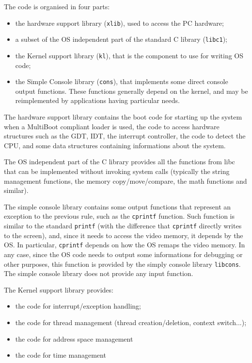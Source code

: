 \documentclass[a4paper]{report}
\begin{document}
The code is organised in four parts: \begin{itemize}
\item the hardware support library ({\tt xlib}), used to access the PC
	hardware;
\item a subset of the OS independent part of the standard C library
	({\tt libc1});
\item the Kernel support library ({\tt kl}), that is the component to
	use for writing OS code;
\item the Simple Console library ({\tt cons}), that implements some
	direct console output functions. These functions generally
	depend on the kernel, and may be reimplemented by applications
	having particular needs.
\end{itemize}

The hardware support library contains the boot code for starting up
the system when a MultiBoot compliant loader is used, the code to
access hardware structures such as the GDT, IDT, the interrupt
controller, the code to detect the CPU, and some data structures
containing informations about the system.

The OS independent part of the C library provides all the functions
from libc that can be implemented without invoking system calls
(typically the string management functions, the memory
copy/move/compare, the math functions and similar).

The simple console library contains some output functions that
represent an exception to the previous rule, such as the {\tt cprintf}
function. Such function is similar to the standard {\tt printf} (with the
difference that {\tt cprintf} directly writes to the screen), and,
since it needs to access the video memory, it depends by the OS. In
particular, {\tt cprintf} depends on how the OS remaps the video
memory. In any case, since the OS code needs to output some
informations for debugging or other purposes, this function is
provided by the simply console library {\tt libcons}. The simple
console library does not provide any input function.

The Kernel support library provides: \begin{itemize}
\item the code for interrupt/exception handling;
\item the code for thread management (thread creation/deletion,
	context switch...);
\item the code for address space management
\item the code for time management
\end{itemize}
\end{document}
